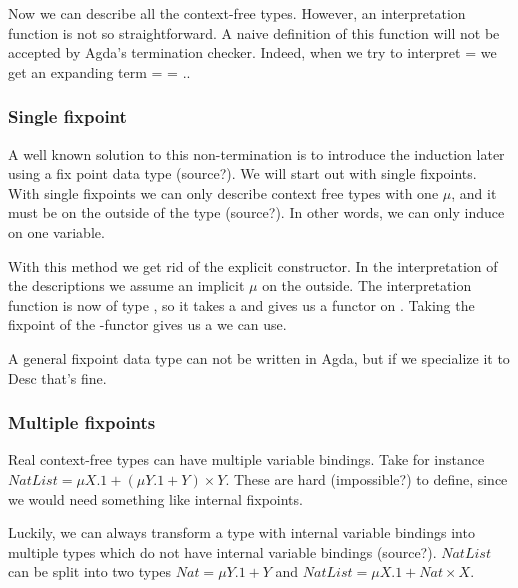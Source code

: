 
Now we can describe all the context-free types.
However, an interpretation function  is not so
straightforward.
A naive definition of this function will not be accepted by Agda's
termination checker.
Indeed, when we try to interpret  =   
\AY{(}\AF{\#} \AY{)} we get an expanding term  
 =      = ..

\subsubsection{Single fixpoint}

A well known solution to this non-termination is to introduce the
induction later using a fix point data type (source?).
We will start out with single fixpoints.
With single fixpoints we can only describe context free types with one
$μ$, and it must be on the outside of the type (source?).
In other words, we can only induce on one variable.

With this method we get rid of the explicit  constructor.
In the interpretation of the descriptions we assume an implicit $μ$ on
the outside.
The interpretation function  is now of type  
  , so it takes a  and gives us a
functor on .
Taking the fixpoint of the -functor gives us a  we can
use.


\begin{shaded}
  A general fixpoint data type can not be written in Agda, but if we
  specialize it to Desc that's fine.
\end{shaded}

\subsubsection{Multiple fixpoints}

Real context-free types can have multiple variable bindings.
Take for instance $NatList = μX. 1 + (μY. 1 + Y) × Y$.
These are hard (impossible?) to define, since we would need something
like internal fixpoints.

Luckily, we can always transform a type with internal variable
bindings into multiple types which do not have internal variable
bindings (source?).
$NatList$ can be split into two types $Nat = μY. 1 + Y$ and $NatList =
μX. 1 + Nat × X$.

